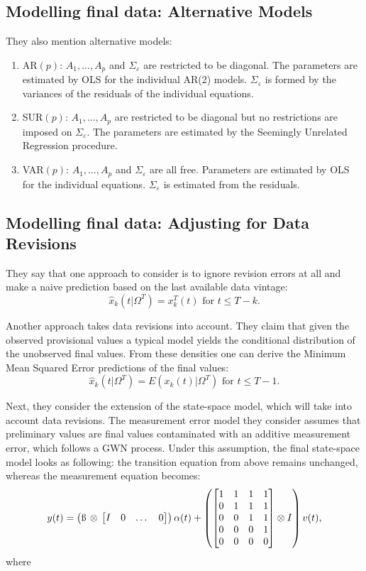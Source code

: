 \documentclass[8pt, a4paper, twocolumn, landscape]{extarticle}
\begin{document}
\subsection{Modelling final data: Alternative Models}
They also mention alternative models:
\begin{enumerate}
	\item AR$(p)$: $A_1, \dots, A_p$ and $\Sigma_{\varepsilon}$ are restricted to be diagonal. The parameters are estimated by OLS for the individual AR(2) models. $\Sigma_{\varepsilon}$ is formed by the variances of the residuals of the individual equations.
	\item SUR$(p)$: $A_1, \dots, A_p$ are restricted to be diagonal but no restrictions are imposed on $\Sigma_{\varepsilon}$. The parameters are estimated by the Seemingly Unrelated Regression procedure.
	\item VAR$(p)$:  $A_1, \dots, A_p$ and $\Sigma_{\varepsilon}$ are all free. Parameters are estimated by OLS for the individual equations. $\Sigma_{\varepsilon}$ is estimated from the residuals.
\end{enumerate}

\subsection{Modelling final data: Adjusting for Data Revisions}
They say that one approach to consider is to ignore revision errors at all and make a naive prediction based on the last available data vintage:
\[
\hat{x}_k(t | \Omega^T) = x_k^T(t) \text{ for } t \le T - k.
\]

Another approach takes data revisions into account. They claim that given the observed provisional values a typical model yields the conditional distribution of the unobserved final values. From these densities one can derive the Minimum Mean Squared Error predictions of the final values:
\[
\hat{x}_k(t | \Omega^T) = E(x_k(t) | \Omega^T) \text{ for } t \le T - 1.
\]

Next, they consider the extension of the state-space model, which will take into account data revisions. The measurement error model they consider assumes that preliminary values are final values contaminated with an additive measurement error, which follows a GWN process. Under this assumption, the final state-space model looks as following: the transition equation from above remains unchanged, whereas the measurement equation becomes:
\[
y(t) = 
\begin{pmatrix}
\i \, \otimes \, 
\begin{bmatrix}
I & 0 & \dots & 0
\end{bmatrix}
\end{pmatrix} \alpha(t) + 
\begin{pmatrix}
\begin{bmatrix}
1 & 1 & 1 & 1 \\
0 & 1 & 1 & 1 \\
0 & 0 & 1 & 1 \\
0 & 0 & 0 & 1 \\
0 & 0 & 0 & 0
\end{bmatrix} \otimes I
\end{pmatrix} v(t),
\]
where
\end{document}
